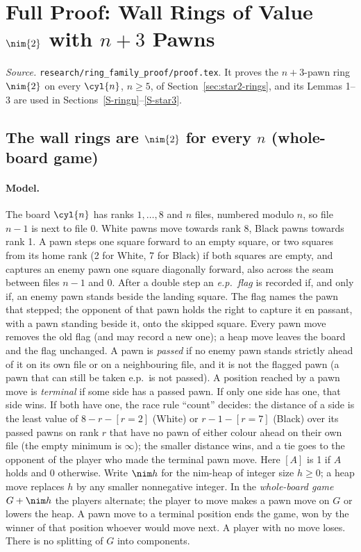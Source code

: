 \section{Full Proof: Wall Rings of Value \texorpdfstring{$\nim{2}$}{*2} with \texorpdfstring{$n+3$}{n+3} Pawns}\label{S-wall}
\noindent\emph{Source.} \texttt{research/ring\_family\_proof/proof.tex}. It proves the $n+3$-pawn ring $\nim{2}$ on every $\cyl{n}$, $n\ge5$, of Section~\ref{sec:star2-rings}, and its Lemmas 1--3 are used in Sections~\ref{S-ringn}--\ref{S-star3}.


\subsection{The wall rings are $\nim{2}$ for every $n$ (whole-board game)}

\paragraph{Model.}
The board $\cyl{n}$ has ranks $1,\dots,8$ and $n$ files, numbered modulo $n$, so file $n-1$ is next to file $0$. White pawns move
towards rank 8, Black pawns towards rank 1. A pawn steps one square forward to an empty square, or two squares from its home rank (2 for
White, 7 for Black) if both squares are empty, and captures an enemy pawn one square diagonally forward, also across the seam
between files $n-1$ and $0$. After a double step an \emph{e.p.\ flag} is recorded if, and only if, an enemy pawn stands beside the landing
square. The flag names the pawn that stepped; the opponent of that pawn holds the right to capture it en passant, with a pawn standing beside it, onto the skipped square.
Every pawn move removes the old flag (and may record a new one); a heap move leaves the board and the flag unchanged.
A pawn is \emph{passed} if no enemy pawn stands strictly ahead of it on its own file or on a neighbouring file, and it is not the
flagged pawn (a pawn that can still be taken e.p.\ is not passed).
A position reached by a pawn move is \emph{terminal} if some side has a passed pawn. If only one side has one, that side wins. If both
have one, the race rule ``count'' decides: the distance of a side is the least value of $8-r-[r=2]$ (White) or $r-1-[r=7]$ (Black) over
its passed pawns on rank $r$ that have no pawn of either colour ahead on their own file (the empty minimum is
$\infty$); the smaller distance wins, and a tie goes to the opponent of the player who made the terminal pawn move. Here $[A]$ is 1 if $A$ holds and 0 otherwise.
Write $\nim h$ for the nim-heap of integer size $h\ge0$; a heap move replaces $h$ by any smaller nonnegative integer.
In the \emph{whole-board game} $G+\nim h$ the players alternate; the player to move makes a pawn move on $G$ or lowers the heap.
A pawn move to a terminal position ends the game, won by the winner of that position whoever would move next. A player with no move
loses. There is no splitting of $G$ into components.

